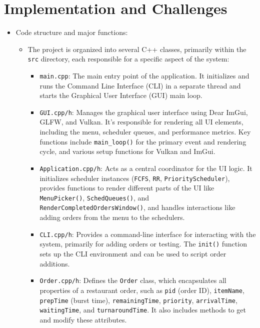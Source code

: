 \documentclass[a4paper,12pt]{article}
\begin{document}
\section{Implementation and Challenges}
\RaggedRight %
\begin{itemize}
    \item Code structure and major functions:
        \begin{itemize}
            \item The project is organized into several C++ classes, primarily within the \nolinkurl{src} directory, each responsible for a specific aspect of the system:
                \begin{itemize}
                    \item \nolinkurl{main.cpp}: The main entry point of the application. It initializes and runs the Command Line Interface (CLI) in a separate thread and starts the Graphical User Interface (GUI) main loop.
                    \item \nolinkurl{GUI.cpp/h}: Manages the graphical user interface using Dear ImGui, GLFW, and Vulkan. It's responsible for rendering all UI elements, including the menu, scheduler queues, and performance metrics. Key functions include \nolinkurl{main_loop()} for the primary event and rendering cycle, and various setup functions for Vulkan and ImGui.
                    \item \nolinkurl{Application.cpp/h}: Acts as a central coordinator for the UI logic. It initializes scheduler instances (\nolinkurl{FCFS}, \nolinkurl{RR}, \nolinkurl{PriorityScheduler}), provides functions to render different parts of the UI like \nolinkurl{MenuPicker()}, \nolinkurl{SchedQueues()}, and \nolinkurl{RenderCompletedOrdersWindow()}, and handles interactions like adding orders from the menu to the schedulers.
                    \item \nolinkurl{CLI.cpp/h}: Provides a command-line interface for interacting with the system, primarily for adding orders or testing. The \nolinkurl{init()} function sets up the CLI environment and can be used to script order additions.
                    \item \nolinkurl{Order.cpp/h}: Defines the \nolinkurl{Order} class, which encapsulates all properties of a restaurant order, such as \nolinkurl{pid} (order ID), \nolinkurl{itemName}, \nolinkurl{prepTime} (burst time), \nolinkurl{remainingTime}, \nolinkurl{priority}, \nolinkurl{arrivalTime}, \nolinkurl{waitingTime}, and \nolinkurl{turnaroundTime}. It also includes methods to get and modify these attributes.

\end{itemize}
\end{itemize}
\end{itemize}
\end{document}
